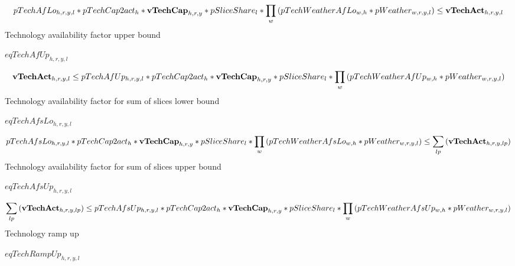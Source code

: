 \documentclass{article}
\begin{document}
\begin{dmath} 
pTechAfLo_{h,r,y,l}*pTechCap2act_{h}*{\bf vTechCap}_{h,r,y}*pSliceShare_{l}*\prod_{w}{\left(pTechWeatherAfLo_{w,h}*pWeather_{w,r,y,l}\right)}  \le  {\bf vTechAct}_{h,r,y,l}
\end{dmath} 
Technology availability factor upper bound







$eqTechAfUp_{h,r,y,l}$





\begin{dmath} 
{\bf vTechAct}_{h,r,y,l}  \le  pTechAfUp_{h,r,y,l}*pTechCap2act_{h}*{\bf vTechCap}_{h,r,y}*pSliceShare_{l}*\prod_{w}{\left(pTechWeatherAfUp_{w,h}*pWeather_{w,r,y,l}\right)}
\end{dmath} 
Technology availability factor for sum of slices lower bound







$eqTechAfsLo_{h,r,y,l}$





\begin{dmath} 
pTechAfsLo_{h,r,y,l}*pTechCap2act_{h}*{\bf vTechCap}_{h,r,y}*pSliceShare_{l}*\prod_{w}{\left(pTechWeatherAfsLo_{w,h}*pWeather_{w,r,y,l}\right)}  \le  \sum_{lp}{\left({\bf vTechAct}_{h,r,y,lp}\right)}
\end{dmath} 
Technology availability factor for sum of slices upper bound







$eqTechAfsUp_{h,r,y,l}$





\begin{dmath} 
\sum_{lp}{\left({\bf vTechAct}_{h,r,y,lp}\right)}  \le  pTechAfsUp_{h,r,y,l}*pTechCap2act_{h}*{\bf vTechCap}_{h,r,y}*pSliceShare_{l}*\prod_{w}{\left(pTechWeatherAfsUp_{w,h}*pWeather_{w,r,y,l}\right)}
\end{dmath} 
Technology ramp up







$eqTechRampUp_{h,r,y,l}$
\end{document}
